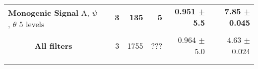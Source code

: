 \begin{tabularx}{\linewidth}{p{3.1cm} p{3cm} r r r r r}
\midrule
\multirow{2}{3.1cm}{\centering
    \textbf{Monogenic Signal}
    \newline A, $\psi$, $\theta$
    \newline 5 levels}

                                   && \textbf{3} & \textbf{135} &  \textbf{5} & \textbf{0.951 $\pm$ 5.5} & \textbf{7.85 $\pm$ 0.045} \\
                                   &&   &       &       &                   & \\
\midrule
\multicolumn{1}{c}{\textbf{All filters}}
                                   && 3 & 1755  &???    & 0.964 $\pm$ 5.0   & 4.63 $\pm$ 0.024 \\
                                   &&   &       &       &                   & \\

\bottomrule
\noalign{\smallskip}
\end{tabularx}
